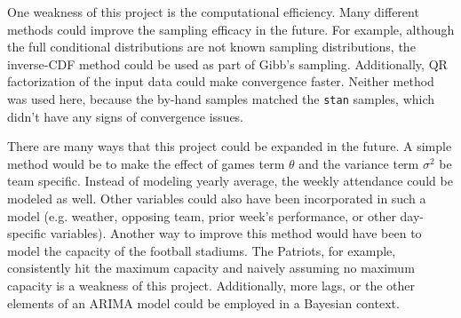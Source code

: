 \documentclass[11pt]{article}
\newcommand{\code}{\texttt}
\begin{document}
One weakness of this project is the computational efficiency. Many different methods could improve the sampling efficacy in the future. For example, although the full conditional distributions are not known sampling distributions, the inverse-CDF method could be used as part of Gibb's sampling. Additionally, QR factorization of the input data could make convergence faster. Neither method was used here, because the by-hand samples matched the \code{stan} samples, which didn't have any signs of convergence issues.

There are many ways that this project could be expanded in the future. A simple method would be to make the effect of games term $\theta$ and the variance term $\sigma^2$ be team specific. Instead of modeling yearly average, the weekly attendance could be modeled as well. Other variables could also have been incorporated in such a model (e.g. weather, opposing team, prior week's performance, or other day-specific variables). Another way to improve this method would have been to model the capacity of the football stadiums. The Patriots, for example, consistently hit the maximum capacity and naively assuming no maximum capacity is a weakness of this project. Additionally, more lags, or the other elements of an ARIMA model could be employed in a Bayesian context.

\vspace*{-.5\baselineskip}


\end{document}
